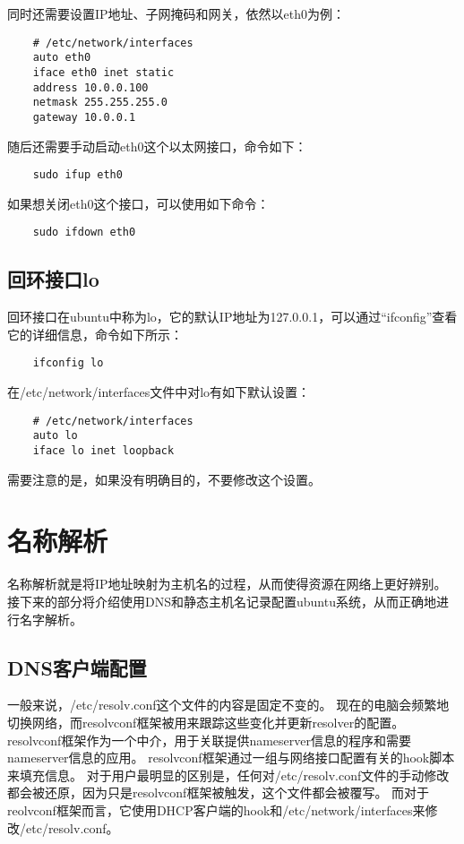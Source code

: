 \documentclass[a4paper,left=2.5cm,right=2.5cm,11pt]{article}
\begin{document}
	同时还需要设置IP地址、子网掩码和网关，依然以eth0为例：
	\begin{lstlisting}
	# /etc/network/interfaces
	auto eth0
	iface eth0 inet static
	address 10.0.0.100
	netmask 255.255.255.0
	gateway 10.0.0.1
	\end{lstlisting}

	随后还需要手动启动eth0这个以太网接口，命令如下：
	\begin{lstlisting}
	sudo ifup eth0
	\end{lstlisting}

	如果想关闭eth0这个接口，可以使用如下命令：
	\begin{lstlisting}
	sudo ifdown eth0
	\end{lstlisting}

\subsection{回环接口lo}
	回环接口在ubuntu中称为lo，它的默认IP地址为127.0.0.1，可以通过“ifconfig”查看它的详细信息，命令如下所示：
	\begin{lstlisting}
	ifconfig lo
	\end{lstlisting}

	在/etc/network/interfaces文件中对lo有如下默认设置：
	\begin{lstlisting}
	# /etc/network/interfaces
	auto lo
	iface lo inet loopback
	\end{lstlisting}

	需要注意的是，如果没有明确目的，不要修改这个设置。

\section{名称解析}
	名称解析就是将IP地址映射为主机名的过程，从而使得资源在网络上更好辨别。
	接下来的部分将介绍使用DNS和静态主机名记录配置ubuntu系统，从而正确地进行名字解析。

\subsection{DNS客户端配置}
	一般来说，/etc/resolv.conf这个文件的内容是固定不变的。
	现在的电脑会频繁地切换网络，而resolvconf框架被用来跟踪这些变化并更新resolver的配置。
	resolvconf框架作为一个中介，用于关联提供nameserver信息的程序和需要nameserver信息的应用。
	resolvconf框架通过一组与网络接口配置有关的hook脚本来填充信息。
	对于用户最明显的区别是，任何对/etc/resolv.conf文件的手动修改都会被还原，因为只是resolvconf框架被触发，这个文件都会被覆写。
	而对于reolvconf框架而言，它使用DHCP客户端的hook和/etc/network/interfaces来修改/etc/resolv.conf。\par
\end{document}
